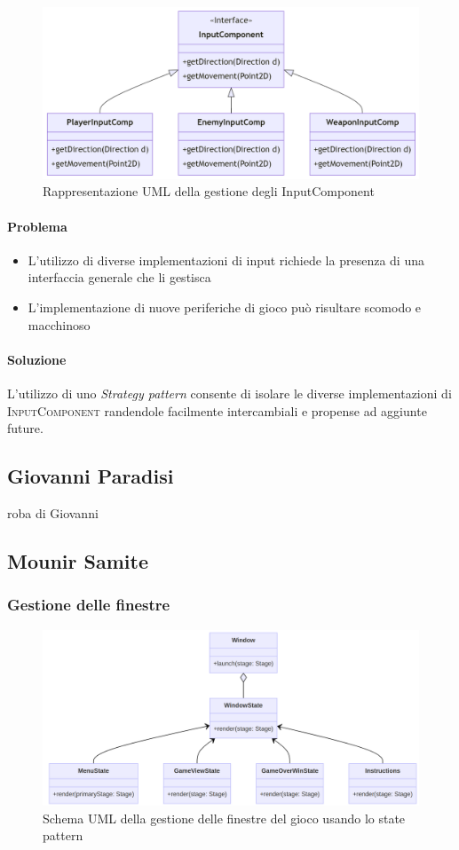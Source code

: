 \documentclass[a4paper,12pt]{report}
\begin{document}
\begin{figure}[H]
\centering{}
\includegraphics[width=\textwidth,keepaspectratio]{img/InputComponentUML.png}
\caption{Rappresentazione UML della gestione degli InputComponent}
\end{figure}

\paragraph{Problema}
\begin{itemize}
    \item L'utilizzo di diverse implementazioni di input richiede la presenza di una interfaccia generale che li gestisca
    \item L'implementazione di nuove periferiche di gioco può risultare scomodo e macchinoso
\end{itemize}
\paragraph{Soluzione}
L'utilizzo di uno \textit{Strategy pattern} consente di isolare le diverse implementazioni di \textsc{InputComponent} randendole facilmente intercambiali e propense ad aggiunte future.
    
\subsection*{Giovanni Paradisi}
roba di Giovanni
\subsection*{Mounir Samite}
\subsubsection*{Gestione delle finestre}
\begin{figure}[h]
\centering{}
\includegraphics[width=1\textwidth]{img/WindowManagement.png}
\caption{Schema UML della gestione delle finestre del gioco usando lo state pattern}
\end{figure}
\end{document}
